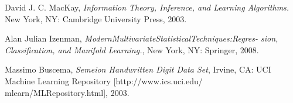 \begin{thebibliography}{1}

David J. C. MacKay, \emph{Information Theory, Inference, and Learning Algorithms.} New York, NY: Cambridge University Press, 2003.

Alan Julian Izenman, \emph{ModernMultivariateStatisticalTechniques:Regres- sion, Classification, and Manifold Learning.}, New York, NY: Springer, 2008.

Massimo Buscema, \emph{Semeion Handwritten Digit Data Set}, Irvine, CA: UCI Machine Learning Repository [http://www.ics.uci.edu/ mlearn/MLRepository.html], 2003.

\end{thebibliography}